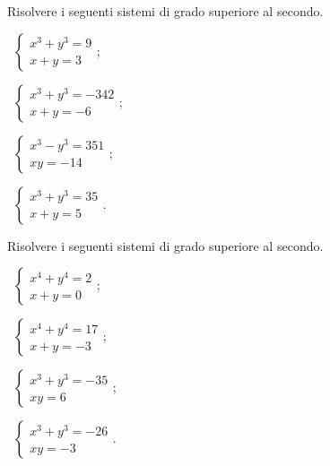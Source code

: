 \begin{esercizio}[\Ast]
 \label{ese:6.36}
Risolvere i seguenti sistemi di grado superiore al secondo.
\begin{multicols}{2}
 \begin{enumeratea}
 \item~$\left\{\begin{array}{l}x^3+y^3=9\\x+y=3\end{array}\right.$;
 \item~$\left\{\begin{array}{l}x^3+y^3=-342\\x+y=-6\end{array}\right.$;
 \item~$\left\{\begin{array}{l}{x^3-y^3=351}\\{{xy}=-14}\end{array}\right.$;
 \item~$\left\{\begin{array}{l}x^3+y^3=35\\x+y=5\end{array}\right.$.
 \end{enumeratea}
 \end{multicols}
\end{esercizio}

\begin{esercizio}[\Ast]
 \label{ese:6.37}
Risolvere i seguenti sistemi di grado superiore al secondo.
\begin{multicols}{2}
 \begin{enumeratea}
 \item~$\left\{\begin{array}{l}x^4+y^4=2\\x+y=0\end{array}\right.$;
 \item~$\left\{\begin{array}{l}x^4+y^4=17\\x+y=-3\end{array}\right.$;
 \item~$\left\{\begin{array}{l}x^3+y^3=-35\\xy=6\end{array}\right.$;
 \item~$\left\{\begin{array}{l}x^3+y^3=-26\\xy=-3\end{array}\right.$.
 \end{enumeratea}
 \end{multicols}
\end{esercizio}

